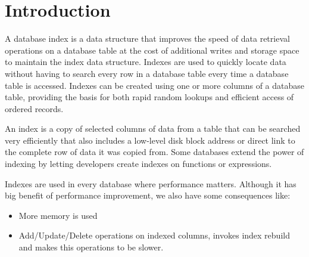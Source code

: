 \section*{Introduction}

A database index is a data structure that improves the speed of data retrieval operations on a database table at the cost of additional writes and storage space to maintain the index data structure. Indexes are used to quickly locate data without having to search every row in a database table every time a database table is accessed. Indexes can be created using one or more columns of a database table, providing the basis for both rapid random lookups and efficient access of ordered records.

An index is a copy of selected columns of data from a table that can be searched very efficiently that also includes a low-level disk block address or direct link to the complete row of data it was copied from. Some databases extend the power of indexing by letting developers create indexes on functions or expressions. 

Indexes are used in every database where performance matters. Although it has big benefit of performance improvement, we also have some consequences like:
\begin{itemize}
	\item More memory is used
	\item Add/Update/Delete operations on indexed columns, invokes index rebuild and makes this operations to be slower.
\end{itemize}

\clearpage